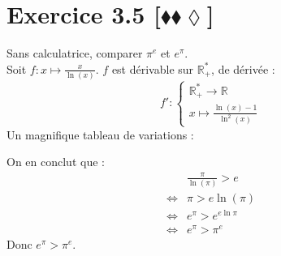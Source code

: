 \documentclass[10pt]{article}
\begin{document}
\section*{Exercice 3.5 [$\blacklozenge\blacklozenge\lozenge$]}
\begin{tcolorbox}[enhanced, width=6in, center, size=fbox, fontupper=\large, drop shadow southwest]
    Sans calculatrice, comparer $\pi^e$ et $e^\pi$.\\
    Soit $f:x\mapsto\frac{x}{\ln(x)}$. $f$ est dérivable sur $\mathbb{R}^*_+$, de dérivée :
    \begin{equation*}
        f':\begin{cases}\mathbb{R}^*_+\rightarrow\mathbb{R}\\x\mapsto\frac{\ln(x)-1}{\ln^2(x)}\end{cases}
    \end{equation*}
    Un magnifique tableau de variations :
    \begin{center}
    \end{center}
    On en conclut que :
    \begin{align*}
        &\frac{\pi}{\ln(\pi)}>e\\
        \iff&\pi>e\ln(\pi)\\
        \iff&e^\pi>e^{e\ln{\pi}}\\
        \iff&e^\pi>\pi^e
    \end{align*}
    Donc $e^\pi>\pi^e$.
\end{tcolorbox}

\end{document}
